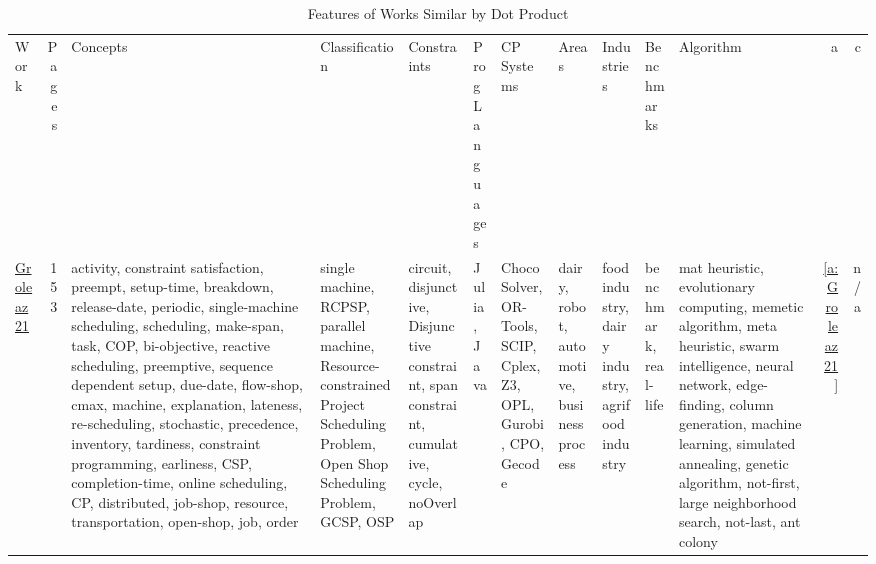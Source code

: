 {\scriptsize
\begin{longtable}{>{\raggedright\arraybackslash}p{3cm}r>{\raggedright\arraybackslash}p{4cm}p{1.5cm}p{2cm}p{1.5cm}p{1.5cm}p{1.5cm}p{1.5cm}p{2cm}p{1.5cm}rr}
\rowcolor{white}\caption{Features of Works Similar by Dot Product}\\ \toprule
\rowcolor{white}Work & Pages & Concepts & Classification & Constraints & \shortstack{Prog\\Languages} & \shortstack{CP\\Systems} & Areas & Industries & Benchmarks & Algorithm & a & c\\ \midrule\endhead
\bottomrule
\endfoot
\href{../works/Groleaz21.pdf}{Groleaz21}~\cite{Groleaz21} & 153 & activity, constraint satisfaction, preempt, setup-time, breakdown, release-date, periodic, single-machine scheduling, scheduling, make-span, task, COP, bi-objective, reactive scheduling, preemptive, sequence dependent setup, due-date, flow-shop, cmax, machine, explanation, lateness, re-scheduling, stochastic, precedence, inventory, tardiness, constraint programming, earliness, CSP, completion-time, online scheduling, CP, distributed, job-shop, resource, transportation, open-shop, job, order & single machine, RCPSP, parallel machine, Resource-constrained Project Scheduling Problem, Open Shop Scheduling Problem, GCSP, OSP & circuit, disjunctive, Disjunctive constraint, span constraint, cumulative, cycle, noOverlap & Julia, Java & Choco Solver, OR-Tools, SCIP, Cplex, Z3, OPL, Gurobi, CPO, Gecode & dairy, robot, automotive, business process & food industry, dairy industry, agrifood industry & benchmark, real-life & mat heuristic, evolutionary computing, memetic algorithm, meta heuristic, swarm intelligence, neural network, edge-finding, column generation, machine learning, simulated annealing, genetic algorithm, not-first, large neighborhood search, not-last, ant colony & \ref{a:Groleaz21} & n/a\\

\end{longtable}}
